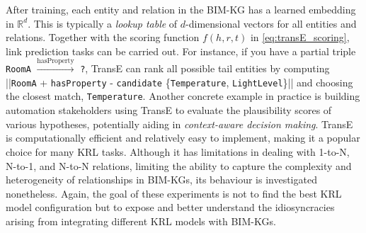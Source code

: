 \begin{enumerate}
After training, each entity and relation in the \ac{BIM-KG} has a learned embedding in $\mathbb{R}^d$. This is typically a \emph{lookup table} of $d$-dimensional vectors for all entities and relations. Together with the scoring function $f(h, r, t)$ in \autoref{eq:transE_scoring}, link prediction tasks can be carried out. For instance, if you have a partial triple \texttt{RoomA} $\xrightarrow{\text{hasProperty}}$ \texttt{?}, TransE can rank all possible tail entities by computing ||\texttt{RoomA} + \texttt{hasProperty} - \texttt{candidate} \in  
\{\texttt{Temperature}, \texttt{LightLevel}\}|| and choosing the closest match, \texttt{Temperature}.
Another concrete example in practice is building automation stakeholders using TransE to evaluate the plausibility scores of various hypotheses, potentially aiding in \textit{context-aware decision making}. TransE is computationally efficient and relatively easy to implement, making it a popular choice for many \ac{KRL} tasks. Although it has limitations in dealing with 1-to-N, N-to-1, and N-to-N relations, limiting the ability to capture the complexity and heterogeneity of relationships in \acp{BIM-KG}, its behaviour is investigated nonetheless. Again, the goal of these experiments is not to find the best \ac{KRL} model configuration but to expose and better understand the idiosyncracies arising from integrating different \ac{KRL} models with \acp{BIM-KG}.


\end{enumerate}
